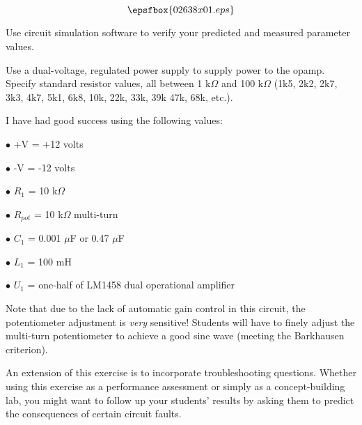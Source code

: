

$$\epsfbox{02638x01.eps}$$

\vfil \eject






Use circuit simulation software to verify your predicted and measured parameter values.







Use a dual-voltage, regulated power supply to supply power to the opamp.  Specify standard resistor values, all between 1 k$\Omega$ and 100 k$\Omega$ (1k5, 2k2, 2k7, 3k3, 4k7, 5k1, 6k8, 10k, 22k, 33k, 39k 47k, 68k, etc.).

I have had good success using the following values:

\medskip
\item{$\bullet$} +V = +12 volts
\item{$\bullet$} -V = -12 volts
\item{$\bullet$} $R_1$ = 10 k$\Omega$
\item{$\bullet$} $R_{pot}$ = 10 k$\Omega$ multi-turn
\item{$\bullet$} $C_1$ = 0.001 $\mu$F or 0.47 $\mu$F
\item{$\bullet$} $L_1$ = 100 mH
\item{$\bullet$} $U_1$ = one-half of LM1458 dual operational amplifier
\medskip

Note that due to the lack of automatic gain control in this circuit, the potentiometer adjustment is {\it very} sensitive!  Students will have to finely adjust the multi-turn potentiometer to achieve a good sine wave (meeting the Barkhausen criterion).

An extension of this exercise is to incorporate troubleshooting questions.  Whether using this exercise as a performance assessment or simply as a concept-building lab, you might want to follow up your students' results by asking them to predict the consequences of certain circuit faults.





